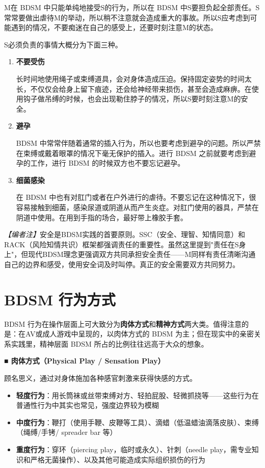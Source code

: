 \documentclass[12pt,UTF8]{ctexbook}
\begin{document}
M在 BDSM 中只能单纯地接受S的行为，所以在 BDSM 中S要担负起全部责任。S常常要做出虐待M的举动，所以稍不注意就会造成重大的事故。所以S应考虑到可能遇到的情况，不要痴迷在自己的感受上，还要时刻注意M的状态。

S必须负责的事情大概分为下面三种。

\begin{enumerate}
	\item \textbf{不要受伤}

	长时间地使用绳子或束缚道具，会对身体造成压迫。保持固定姿势的时间太长，不仅仅会给身上留下痕迹，还会给神经带来损伤，甚至会造成麻痹。在使用钩子做吊缚的时候，也会出现勒住脖子的情况，所以S要时刻注意M的安全。

	\item \textbf{避孕}

	BDSM 中常常伴随着通常的插入行为，所以也要考虑到避孕的问题。所以严禁在束缚或戴着眼罩的情况下毫无保护的插入。进行 BDSM 之前就要考虑到避孕的工作，进行 BDSM 的时候双方也不要忘记避孕。

	\item \textbf{细菌感染}

	在 BDSM 中也有对肛门或者在户外进行的虐待。不要忘记在这种情况下，很容易接触到细菌，感染尿道或阴道从而产生炎症。对肛门使用的器具，严禁在阴道中使用。在用到手指的场合，最好带上橡胶手套。
\end{enumerate}

\textit{【编者注】}安全是BDSM实践的首要原则。SSC（安全、理智、知情同意）和RACK（风险知情共识）框架都强调责任的重要性。虽然这里提到"责任在S身上"，但现代BDSM理念更强调双方共同承担安全责任——M同样有责任清晰沟通自己的边界和感受，使用安全词及时叫停。真正的安全需要双方共同努力。

\section{BDSM 行为方式}

BDSM 行为在操作层面上可大致分为\textbf{肉体方式}和\textbf{精神方式}两大类。值得注意的是：在AV或成人游戏中呈现的，以肉体方式的 BDSM 为主；但在现实中的亲密关系实践里，精神层面 BDSM 所占的比例往往远高于大众的想象。

\noindent\textbf{■ 肉体方式（Physical Play / Sensation Play）}

顾名思义，通过对身体施加各种感官刺激来获得快感的方式。

\begin{itemize}
	\item \textbf{轻度行为}：用长筒袜或丝带束缚对方、轻拍屁股、轻微抓挠等——这些行为在普通性行为中其实也常见，强度边界较为模糊
	\item \textbf{中度行为}：鞭打（使用手鞭、皮鞭等工具）、滴蜡（低温蜡油滴落皮肤）、束缚（绳缚/手铐/ spreader bar 等）
	\item \textbf{重度行为}：穿环（piercing play，临时或永久）、针刺（needle play，需专业知识和严格无菌操作）、以及其他可能造成实际组织损伤的行为
\end{itemize}
\end{document}

